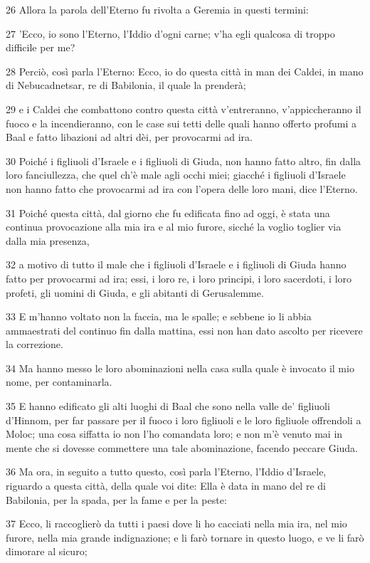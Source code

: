 \par 26 Allora la parola dell'Eterno fu rivolta a Geremia in questi termini:
\par 27 'Ecco, io sono l'Eterno, l'Iddio d'ogni carne; v'ha egli qualcosa di troppo difficile per me?
\par 28 Perciò, così parla l'Eterno: Ecco, io do questa città in man dei Caldei, in mano di Nebucadnetsar, re di Babilonia, il quale la prenderà;
\par 29 e i Caldei che combattono contro questa città v'entreranno, v'appiccheranno il fuoco e la incendieranno, con le case sui tetti delle quali hanno offerto profumi a Baal e fatto libazioni ad altri dèi, per provocarmi ad ira.
\par 30 Poiché i figliuoli d'Israele e i figliuoli di Giuda, non hanno fatto altro, fin dalla loro fanciullezza, che quel ch'è male agli occhi miei; giacché i figliuoli d'Israele non hanno fatto che provocarmi ad ira con l'opera delle loro mani, dice l'Eterno.
\par 31 Poiché questa città, dal giorno che fu edificata fino ad oggi, è stata una continua provocazione alla mia ira e al mio furore, sicché la voglio toglier via dalla mia presenza,
\par 32 a motivo di tutto il male che i figliuoli d'Israele e i figliuoli di Giuda hanno fatto per provocarmi ad ira; essi, i loro re, i loro principi, i loro sacerdoti, i loro profeti, gli uomini di Giuda, e gli abitanti di Gerusalemme.
\par 33 E m'hanno voltato non la faccia, ma le spalle; e sebbene io li abbia ammaestrati del continuo fin dalla mattina, essi non han dato ascolto per ricevere la correzione.
\par 34 Ma hanno messo le loro abominazioni nella casa sulla quale è invocato il mio nome, per contaminarla.
\par 35 E hanno edificato gli alti luoghi di Baal che sono nella valle de' figliuoli d'Hinnom, per far passare per il fuoco i loro figliuoli e le loro figliuole offrendoli a Moloc; una cosa siffatta io non l'ho comandata loro; e non m'è venuto mai in mente che si dovesse commettere una tale abominazione, facendo peccare Giuda.
\par 36 Ma ora, in seguito a tutto questo, così parla l'Eterno, l'Iddio d'Israele, riguardo a questa città, della quale voi dite: Ella è data in mano del re di Babilonia, per la spada, per la fame e per la peste:
\par 37 Ecco, li raccoglierò da tutti i paesi dove li ho cacciati nella mia ira, nel mio furore, nella mia grande indignazione; e li farò tornare in questo luogo, e ve li farò dimorare al sicuro;
